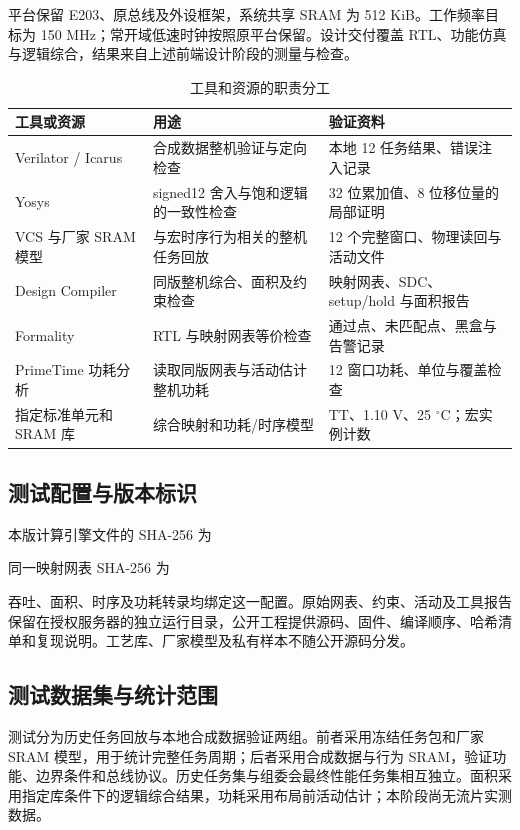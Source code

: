 \documentclass[UTF8,punct,fontset=none,zihao=-4]{ctexart}
\begin{document}
平台保留 E203、原总线及外设框架，系统共享 SRAM 为 512 KiB。工作频率目标为 150 MHz；常开域低速时钟按照原平台保留。设计交付覆盖 RTL、功能仿真与逻辑综合，结果来自上述前端设计阶段的测量与检查\cite{hbird}。

\begin{table}[H]\centering\small
\caption{工具和资源的职责分工}
\begin{tabularx}{\linewidth}{p{35mm}YY}\toprule
工具或资源 & 用途 & 验证资料\\\midrule
Verilator / Icarus & 合成数据整机验证与定向检查 & 本地 12 任务结果、错误注入记录\\
Yosys & signed12 舍入与饱和逻辑的一致性检查 & 32 位累加值、8 位移位量的局部证明\\
VCS 与厂家 SRAM 模型 & 与宏时序行为相关的整机任务回放 & 12 个完整窗口、物理读回与活动文件\\
Design Compiler & 同版整机综合、面积及约束检查 & 映射网表、SDC、setup/hold 与面积报告\\
Formality & RTL 与映射网表等价检查 & 通过点、未匹配点、黑盒与告警记录\\
PrimeTime 功耗分析 & 读取同版网表与活动估计整机功耗 & 12 窗口功耗、单位与覆盖检查\\
指定标准单元和 SRAM 库 & 综合映射和功耗/时序模型 & TT、1.10 V、25 $^\circ$C；宏实例计数\\
\bottomrule\end{tabularx}
\end{table}

\subsection{测试配置与版本标识}
本版计算引擎文件的 SHA-256 为\par
\noindent\small{}\normalsize\par
同一映射网表 SHA-256 为\par
\noindent\small{}\normalsize\par
吞吐、面积、时序及功耗转录均绑定这一配置。原始网表、约束、活动及工具报告保留在授权服务器的独立运行目录，公开工程提供源码、固件、编译顺序、哈希清单和复现说明。工艺库、厂家模型及私有样本不随公开源码分发。

\subsection{测试数据集与统计范围}
测试分为历史任务回放与本地合成数据验证两组。前者采用冻结任务包和厂家 SRAM 模型，用于统计完整任务周期；后者采用合成数据与行为 SRAM，验证功能、边界条件和总线协议。历史任务集与组委会最终性能任务集相互独立。面积采用指定库条件下的逻辑综合结果，功耗采用布局前活动估计；本阶段尚无流片实测数据。
\clearpage
\end{document}
